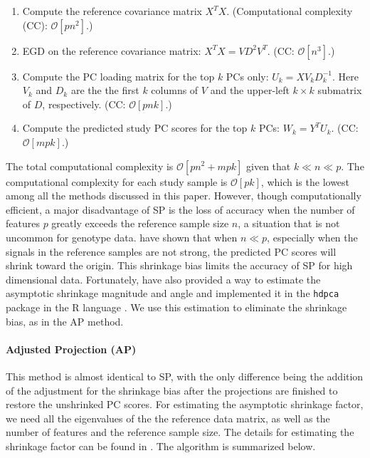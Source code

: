 \documentclass{article}
\newcommand{\bO}{\mathcal{O}}
\begin{document}
\begin{enumerate}
\item Compute the reference covariance matrix $X^T X$.
  (Computational complexity (CC): $\bO[pn^2]$.)  
\item EGD on the reference covariance matrix: $X^T X = V D^2 V^T$.
  (CC: $\bO[n^3]$.)
\item Compute the PC loading matrix for the top $k$ PCs only: $U_k= X V_k D_k^{-1}$.
Here $V_k$ and $D_k$
are the the first $k$ columns of $V$
and the upper-left $k \times k$ submatrix of $D$, respectively.
(CC: $\bO[pnk]$.)
\item Compute the predicted study PC scores for the top $k$ PCs: $W_k = Y^T U_k$.
(CC: $\bO[mpk]$.)
\end{enumerate}
The total computational complexity is  $\bO[pn^2 + mpk]$
given that $k \ll n \ll p$.
The computational complexity for each study sample is $\bO[pk]$,
which is the lowest among all the methods discussed in this paper.
However, though computationally efficient,
a major disadvantage of SP is the loss of accuracy when the number of features $p$ greatly exceeds the reference sample size $n$,
a situation that is not uncommon for genotype data.
\citet{dey2016asymptotic} have shown that when $n \ll p$,
especially when the signals in the reference samples are not strong,
the predicted PC scores will shrink toward the origin.
This shrinkage bias limits the accuracy of SP for high dimensional data.
Fortunately, \citet{dey2016asymptotic} have also provided a way
to estimate the asymptotic shrinkage magnitude and angle
and implemented it in the \verb|hdpca| package in the R language \citep{hdpca}.
We use this estimation to eliminate the shrinkage bias,
as in the AP method.

\paragraph{Adjusted Projection (AP)}

This method is almost identical to SP,
with the only difference being the addition of the adjustment for the shrinkage bias
after the projections are finished to restore the unshrinked PC scores.
For estimating the asymptotic shrinkage factor,
we need all the eigenvalues
of the the reference data matrix,
as well as the number of features
and the reference sample size.
The details for estimating the shrinkage factor can be found in \citet{dey2016asymptotic}.
The algorithm is summarized below.
\end{document}
